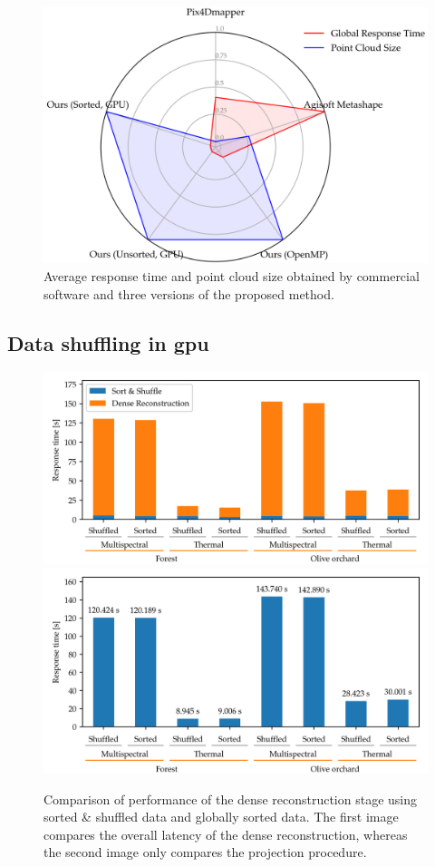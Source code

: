 \begin{figure}[ht]
    \includegraphics[width=.8\linewidth]{figs/multi_thermal_projection/results/normalized_features.png}
    \caption{Average response time and point cloud size obtained by commercial software and three versions of the proposed method.}
    \label{fig:occlusion_normalized_features}
\end{figure}

\subsection{Data shuffling in \acrshort{gpu}}

\begin{figure}
\includegraphics[width=.9\linewidth]{figs/multi_thermal_projection/results/stacked_stage_response_time.png}
\includegraphics[width=.9\linewidth]{figs/multi_thermal_projection/results/shuffled_response_time.png}
\caption{Comparison of performance of the dense reconstruction stage using sorted \& shuffled data and globally sorted data. The first image compares the overall latency of the dense reconstruction, whereas the second image only compares the projection procedure.}
\label{fig:shuffle_comparison}
\end{figure}

